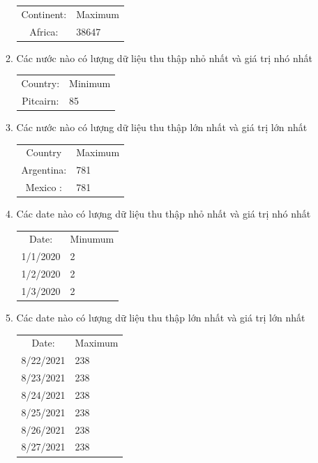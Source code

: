 \documentclass[a4paper]{article}
\theoremstyle{definition}
\begin{document}
\begin{enumerate}[i)]
\begin{enumerate}[1)]
    \begin{center}
      \begin{tabular}{ c l }
  Continent:  & Maximum   \\
   Africa:     &    38647
      \end{tabular}
    \end{center}
    \item Các nước nào có lượng dữ liệu thu thập nhỏ nhất và giá trị nhó nhất 
    \begin{center}
      \begin{tabular}{ c l }
  Country:  & Minimum   \\
  Pitcairn: &   85
      \end{tabular}
    \end{center}
    \item Các nước nào có lượng dữ liệu thu thập lớn nhất và giá trị lớn nhất 
    \begin{center}
      \begin{tabular}{ c l }
  Country   & Maximum   \\
 Argentina: &     781   \\
 Mexico   : &     781
      \end{tabular}
    \end{center}
    \item Các date nào có lượng dữ liệu thu thập nhỏ nhất và giá trị nhó nhất 
    \begin{center}
      \begin{tabular}{ c l }
  Date:      & Minumum  \\
  1/1/2020   &    2     \\
  1/2/2020   &    2     \\
  1/3/2020   &    2    
       \end{tabular}
    \end{center}
    \item Các date nào có lượng dữ liệu thu thập lớn nhất và giá trị lớn nhất 
    \begin{center}
      \begin{tabular}{ c l }
  Date:      & Maximum  \\
  8/22/2021  &   238    \\
  8/23/2021  &   238    \\
  8/24/2021  &   238    \\
  8/25/2021  &   238    \\
  8/26/2021  &   238    \\
  8/27/2021  &   238    \\

\end{tabular}
\end{center}
\end{enumerate}
\end{enumerate}
\end{document}
